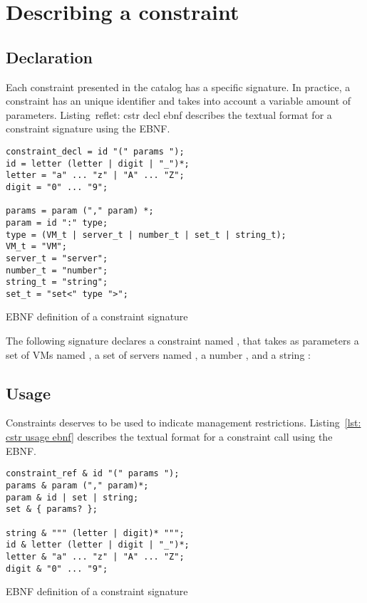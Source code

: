 \section{Describing a constraint}
\label{sec: cstr signature}

\subsection{Declaration}
Each constraint presented in the catalog has a specific signature. In practice, a constraint has
an unique identifier and takes into account a variable amount of parameters.
Listing~ref{let: cstr decl ebnf} describes the textual format for a constraint signature using the EBNF.

\begin{myListing}
\begin{lstlisting}
constraint_decl = id "(" params ");
id = letter (letter | digit | "_")*;
letter = "a" ... "z" | "A" ... "Z";
digit = "0" ... "9";

params = param ("," param) *;
param = id ":" type;
type = (VM_t | server_t | number_t | set_t | string_t);
VM_t = "VM";
server_t = "server";
number_t = "number";
string_t = "string";
set_t = "set<" type ">";
\end{lstlisting}
\caption{EBNF definition of a constraint signature}\label{lst: cstr decl ebnf}
\end{myListing}

The following signature declares a constraint named , that takes as parameters a set of VMs named , a set of servers named , a number , and a string :

\smallskip
{}

\subsection{Usage}

Constraints deserves to be used to indicate management restrictions. Listing~\ref{lst: cstr usage ebnf} describes the textual format for a constraint call using the EBNF.

\begin{myListing}
\begin{lstlisting}
constraint_ref & id "(" params ");
params & param ("," param)*;
param & id | set | string;
set & { params? };

string & """ (letter | digit)* """;
id & letter (letter | digit | "_")*;
letter & "a" ... "z" | "A" ... "Z";
digit & "0" ... "9";
\end{lstlisting}
\caption{EBNF definition of a constraint signature}\label{lst: cstr usage ebnf}
\end{myListing}

